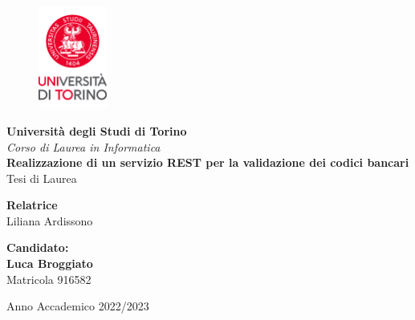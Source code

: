 \thispagestyle{empty}

\begin{figure}[H]
  \centering
  \includegraphics[width=0.2\textwidth]{img/logo_new_2022.png} 
  \label{fig:logo_new_2022.png}
\end{figure}

\begin{center}
    \textbf{\Large Università degli Studi di Torino} \\
    \textit{\Large Corso di Laurea in Informatica} \\
    \hfill \break
    \hfill \break
    \textbf{\huge Realizzazione di un servizio REST per la validazione dei codici bancari}\\
    {\Large Tesi di Laurea}
\end{center}
\vfill
\textbf{\Large Relatrice} \\
{\Large Liliana Ardissono}
\begin{flushright}
\hfill \break
\textbf{\Large Candidato:}\\
\textbf{\Large Luca Broggiato}\\
{\Large Matricola 916582}\\
\hfill \break
\hfill \break
\end{flushright}

\begin{center}
{\large Anno Accademico 2022/2023}
\end{center}